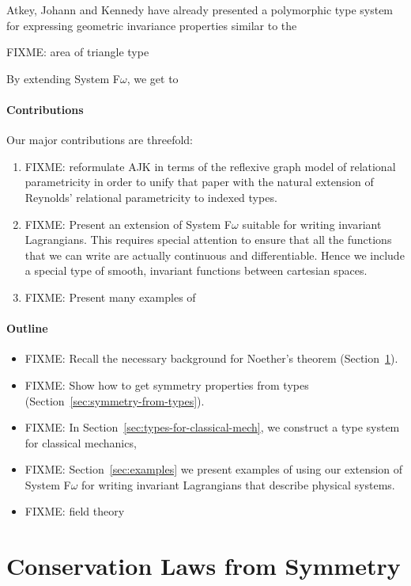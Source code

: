 \documentclass[preprint]{sigplanconf}
\theoremstyle{examplestyle}
\begin{document}
Atkey, Johann and Kennedy \cite{atkey13abstraction} have already
presented a polymorphic type system for expressing geometric
invariance properties similar to the 

FIXME: area of triangle type

By extending System F$\omega$, we get to 

\paragraph{Contributions}

Our major contributions are threefold:
\begin{enumerate}
\item FIXME: reformulate AJK in terms of the reflexive graph model of
  relational parametricity in order to unify that paper with the
  natural extension of Reynolds' relational parametricity to indexed
  types.
\item FIXME: Present an extension of System F$\omega$ suitable for
  writing invariant Lagrangians. This requires special attention to
  ensure that all the functions that we can write are actually
  continuous and differentiable. Hence we include a special type of
  smooth, invariant functions between cartesian spaces.
\item FIXME: Present many examples of 
\end{enumerate}

\paragraph{Outline}

\begin{itemize}
\item FIXME: Recall the necessary background for Noether's theorem
  (Section~\ref{sec:conservation-laws-from-symmetry}).
\item FIXME: Show how to get symmetry properties from types
  (Section~\ref{sec:symmetry-from-types}).
\item FIXME: In Section~\ref{sec:types-for-classical-mech}, we
  construct a type system for classical mechanics,
\item FIXME: Section~\ref{sec:examples} we present examples of using
  our extension of System F$\omega$ for writing invariant Lagrangians
  that describe physical systems.
\item FIXME: field theory
\end{itemize}

\section{Conservation Laws from Symmetry}
\label{sec:conservation-laws-from-symmetry}
\end{document}
